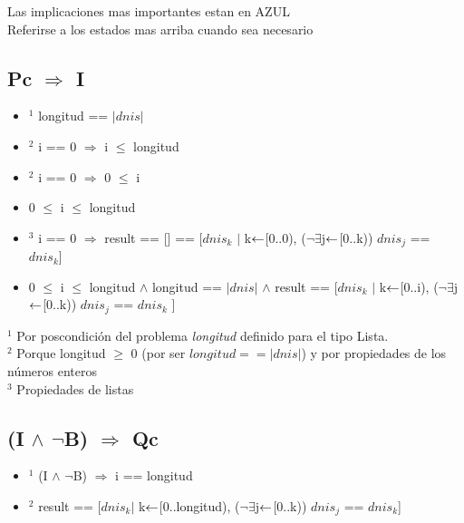 \small Las implicaciones mas importantes estan en \textcolor{NavyBlue}{AZUL}\\
\small Referirse a los estados mas arriba cuando sea necesario\\
\vspace{2mm}

\subsection{Pc $ \Rightarrow $ I}
\begin{itemize}
	\item $ ^1 $ \textcolor{NavyBlue}{longitud == $ |dnis| $}
	\item $ ^2 $ i == 0 $ \Rightarrow $ i $ \leq $ longitud
	\item $ ^2 $ i == 0  $ \Rightarrow $ 0 $ \leq $ i
	\item \textcolor{NavyBlue}{0 $ \leq $ i $ \leq $ longitud}
	\item $ ^3 $ i == 0 $ \Rightarrow $ \textcolor{NavyBlue}{result == [] } == [$ dnis_k $ $ | $ k$ \leftarrow $[0..0), ($ \lnot $$ \exists $j$ \leftarrow $[0..k)) $ dnis_j $ == $ dnis_k $]
	\item \textcolor{NavyBlue}{0 $ \leq $ i $ \leq $ longitud $ \land $ longitud == $ |dnis| $ $ \land $ result == [$ dnis_k $ $ | $ k$ \leftarrow $[0..i), ($ \lnot $$ \exists $j$ \leftarrow $[0..k)) $ dnis_j $ == $ dnis_k $ ]} \checkmark
\end{itemize}
\vspace{3mm}


\noindent $ ^1 $ Por poscondición del problema \emph{longitud} definido para el tipo Lista.\\
$ ^2 $ Porque longitud $\geq$ 0 (por ser $longitud == |dnis|$) y por propiedades de los números enteros\\
$ ^3 $ Propiedades de listas\\

\subsection{(I $ \land $ $ \lnot $B) $ \Rightarrow $ Qc}
\begin{itemize}
	\item $ ^1 $ (I $ \land $ $ \lnot $B) $ \Rightarrow $ i == longitud
	\item $ ^2 $ \textcolor{NavyBlue}{ result == [$ dnis_k $$ | $ k$ \leftarrow $[0..longitud), ($ \lnot $$ \exists $j$ \leftarrow $[0..k)) $ dnis_j $ == $ dnis_k $]} \checkmark
\end{itemize}

